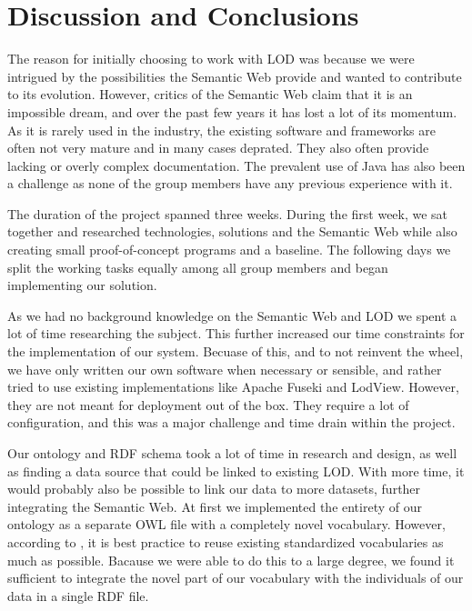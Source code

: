 \chapter{Discussion and Conclusions}

The reason for initially choosing to work with LOD was because we were intrigued by the possibilities the Semantic Web provide and wanted to contribute to its evolution. However, critics of the Semantic Web claim that it is an impossible dream, and over the past few years it has lost a lot of its momentum. As it is rarely used in the industry, the existing software and frameworks are often not very mature and in many cases deprated. They also often provide lacking or overly complex documentation. The prevalent use of Java has also been a challenge as none of the group members have any previous experience with it. 

\vspace{5mm}

The duration of the project spanned three weeks. During the first week, we sat together and researched technologies, solutions and the Semantic Web while also creating small proof-of-concept programs and a baseline. The following days we split the working tasks equally among all group members and began implementing our solution.

\vspace{5mm}

As we had no background knowledge on the Semantic Web and LOD we spent a lot of time researching the subject. This further increased our time constraints for the implementation of our system. Becuase of this, and to not reinvent the wheel, we have only written our own software when necessary or sensible, and rather tried to use existing implementations like Apache Fuseki and LodView. However, they are not meant for deployment out of the box. They require a lot of configuration, and this was a major challenge and time drain within the project.

\vspace{5mm}

Our ontology and RDF schema took a lot of time in research and design, as well as finding a data source that could be linked to existing LOD. With more time, it would probably also be possible to link our data to more datasets, further integrating the Semantic Web. At first we implemented the entirety of our ontology as a separate OWL file with a completely novel vocabulary. However, according to \cite{w3-best-practices}, it is best practice to reuse existing standardized vocabularies as much as possible. Bacause we were able to do this to a large degree, we found it sufficient to integrate the novel part of our vocabulary with the individuals of our data in a single RDF file.

